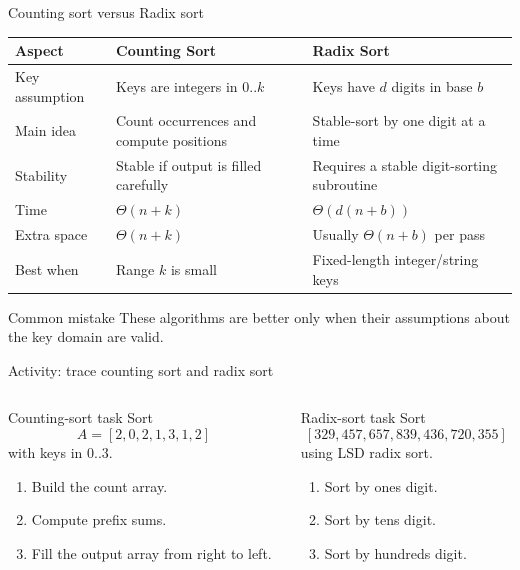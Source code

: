 \documentclass[aspectratio=169]{beamer}
\begin{document}
\begin{frame}{Counting sort versus Radix sort}
\scriptsize
\begin{center}
\renewcommand{\arraystretch}{1.18}
\begin{tabular}{L{0.20\textwidth}L{0.33\textwidth}L{0.33\textwidth}}
\toprule
\textbf{Aspect} & \textbf{Counting Sort} & \textbf{Radix Sort} \\
\midrule
Key assumption & Keys are integers in $0..k$ & Keys have $d$ digits in base $b$ \\
Main idea & Count occurrences and compute positions & Stable-sort by one digit at a time \\
Stability & Stable if output is filled carefully & Requires a stable digit-sorting subroutine \\
Time & $\Theta(n+k)$ & $\Theta(d(n+b))$ \\
Extra space & $\Theta(n+k)$ & Usually $\Theta(n+b)$ per pass \\
Best when & Range $k$ is small & Fixed-length integer/string keys \\
\bottomrule
\end{tabular}
\end{center}
\begin{alertblock}{Common mistake}
  These algorithms are better only when their assumptions about the key domain are valid.
\end{alertblock}
\end{frame}

\begin{frame}{Activity: trace counting sort and radix sort}
\small
\begin{columns}[T,onlytextwidth]
  \begin{column}{0.48\textwidth}
    \begin{block}{Counting-sort task}
      Sort
      \[
        A=[2,0,2,1,3,1,2]
      \]
      with keys in $0..3$.
      \begin{enumerate}\setlength{\itemsep}{0.1em}
        \item Build the count array.
        \item Compute prefix sums.
        \item Fill the output array from right to left.
      \end{enumerate}
    \end{block}
  \end{column}
  \begin{column}{0.48\textwidth}
    \begin{exampleblock}{Radix-sort task}
      Sort
      \[
        [329,457,657,839,436,720,355]
      \]
      using LSD radix sort.
      \begin{enumerate}\setlength{\itemsep}{0.1em}
        \item Sort by ones digit.
        \item Sort by tens digit.
        \item Sort by hundreds digit.
      \end{enumerate}
    \end{exampleblock}
  \end{column}
\end{columns}
\end{frame}
\end{document}
